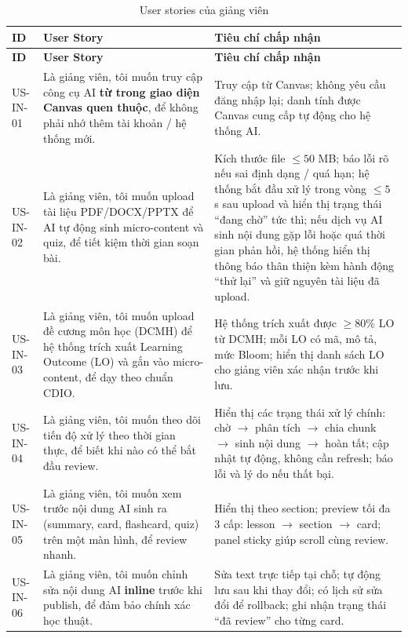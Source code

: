\begingroup
\scriptsize
\setlength{\tabcolsep}{3pt}
\begin{longtable}{|p{1.6cm}|p{5.6cm}|p{7cm}|}
\caption{User stories của giảng viên}
\label{tab:user-stories-giang-vien}\\
\hline
\textbf{ID} & \textbf{User Story} & \textbf{Tiêu chí chấp nhận} \\
\hline
\endfirsthead
\hline
\textbf{ID} & \textbf{User Story} & \textbf{Tiêu chí chấp nhận} \\
\hline
\endhead
US-IN-01 & Là giảng viên, tôi muốn truy cập công cụ AI \textbf{từ trong giao diện Canvas quen thuộc}, để không phải nhớ thêm tài khoản / hệ thống mới. & Truy cập từ Canvas; không yêu cầu đăng nhập lại; danh tính được Canvas cung cấp tự động cho hệ thống AI. \\
\hline
US-IN-02 & Là giảng viên, tôi muốn upload tài liệu PDF/DOCX/PPTX để AI tự động sinh micro-content và quiz, để tiết kiệm thời gian soạn bài. & Kích thước file \(\leq 50\) MB; báo lỗi rõ nếu sai định dạng / quá hạn; hệ thống bắt đầu xử lý trong vòng \(\leq 5\) s sau upload và hiển thị trạng thái ``đang chờ'' tức thì; nếu dịch vụ AI sinh nội dung gặp lỗi hoặc quá thời gian phản hồi, hệ thống hiển thị thông báo thân thiện kèm hành động ``thử lại'' và giữ nguyên tài liệu đã upload. \\
\hline
US-IN-03 & Là giảng viên, tôi muốn upload đề cương môn học (DCMH) để hệ thống trích xuất Learning Outcome (LO) và gắn vào micro-content, để dạy theo chuẩn CDIO. & Hệ thống trích xuất được \(\geq 80\%\) LO từ DCMH; mỗi LO có mã, mô tả, mức Bloom; hiển thị danh sách LO cho giảng viên xác nhận trước khi lưu. \\
\hline
US-IN-04 & Là giảng viên, tôi muốn theo dõi tiến độ xử lý theo thời gian thực, để biết khi nào có thể bắt đầu review. & Hiển thị các trạng thái xử lý chính: chờ \(\rightarrow\) phân tích \(\rightarrow\) chia chunk \(\rightarrow\) sinh nội dung \(\rightarrow\) hoàn tất; cập nhật tự động, không cần refresh; báo lỗi và lý do nếu thất bại. \\
\hline
US-IN-05 & Là giảng viên, tôi muốn xem trước nội dung AI sinh ra (summary, card, flashcard, quiz) trên một màn hình, để review nhanh. & Hiển thị theo section; preview tối đa 3 cấp: lesson \(\rightarrow\) section \(\rightarrow\) card; panel sticky giúp scroll cùng review. \\
\hline
US-IN-06 & Là giảng viên, tôi muốn chỉnh sửa nội dung AI \textbf{inline} trước khi publish, để đảm bảo chính xác học thuật. & Sửa text trực tiếp tại chỗ; tự động lưu sau khi thay đổi; có lịch sử sửa đổi để rollback; ghi nhận trạng thái ``đã review'' cho từng card. \\

\end{longtable}

